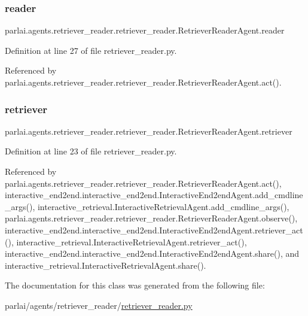 \subsubsection{\texorpdfstring{reader}{reader}}
{\footnotesize\ttfamily parlai.\+agents.\+retriever\+\_\+reader.\+retriever\+\_\+reader.\+Retriever\+Reader\+Agent.\+reader}



Definition at line 27 of file retriever\+\_\+reader.\+py.



Referenced by parlai.\+agents.\+retriever\+\_\+reader.\+retriever\+\_\+reader.\+Retriever\+Reader\+Agent.\+act().

\mbox{\label{classparlai_1_1agents_1_1retriever__reader_1_1retriever__reader_1_1RetrieverReaderAgent_a5695be3aea22476bb07b09c4a76e5b5d}} 
\subsubsection{\texorpdfstring{retriever}{retriever}}
{\footnotesize\ttfamily parlai.\+agents.\+retriever\+\_\+reader.\+retriever\+\_\+reader.\+Retriever\+Reader\+Agent.\+retriever}



Definition at line 23 of file retriever\+\_\+reader.\+py.



Referenced by parlai.\+agents.\+retriever\+\_\+reader.\+retriever\+\_\+reader.\+Retriever\+Reader\+Agent.\+act(), interactive\+\_\+end2end.\+interactive\+\_\+end2end.\+Interactive\+End2end\+Agent.\+add\+\_\+cmdline\+\_\+args(), interactive\+\_\+retrieval.\+Interactive\+Retrieval\+Agent.\+add\+\_\+cmdline\+\_\+args(), parlai.\+agents.\+retriever\+\_\+reader.\+retriever\+\_\+reader.\+Retriever\+Reader\+Agent.\+observe(), interactive\+\_\+end2end.\+interactive\+\_\+end2end.\+Interactive\+End2end\+Agent.\+retriever\+\_\+act(), interactive\+\_\+retrieval.\+Interactive\+Retrieval\+Agent.\+retriever\+\_\+act(), interactive\+\_\+end2end.\+interactive\+\_\+end2end.\+Interactive\+End2end\+Agent.\+share(), and interactive\+\_\+retrieval.\+Interactive\+Retrieval\+Agent.\+share().



The documentation for this class was generated from the following file\+:\begin{DoxyCompactItemize}
\item 
parlai/agents/retriever\+\_\+reader/\hyperlink{retriever__reader_8py}{retriever\+\_\+reader.\+py}\end{DoxyCompactItemize}
